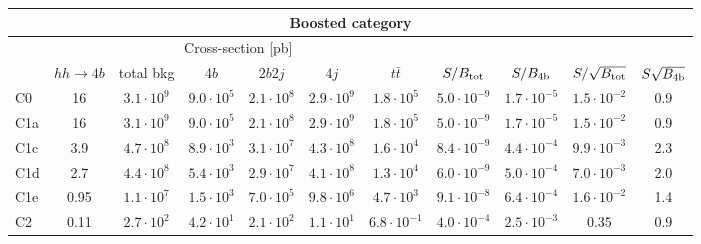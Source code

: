 \begin{tabular}{|l|cc|cccc|cccc|}
  \hline
\multicolumn{11}{|c|}{Boosted category}\\
\hline
&  \multicolumn{6}{c|}{Cross-section [pb]} &  &  & &  \\
   &  $hh\to 4b$ &  total bkg  &   $4b$    &  $2b2j$   &   $4j$    &
$t\bar{t}$ &
$S/B_{\rm tot}$ & $S/B_{\rm 4b}$ & $S/\sqrt{B_{\rm tot}}$ & $S\sqrt{B_{\rm 4b}}$ \\
  \hline
  \hline
 C0      & 16  &   $3.1\cdot 10^9$   & $9.0\cdot 10^5$ & $2.1\cdot 10^8$ & $2.9\cdot 10^9$ & $1.8\cdot 10^5$ &   $5.0\cdot 10^{-9}$   & $1.7\cdot 10^{-5}$  &   $1.5\cdot 10^{-2}$   & 0.9 \\
 C1a     & 16  &   $3.1\cdot 10^9 $  & $9.0\cdot 10^5$ & $2.1\cdot 10^8$ & $2.9\cdot 10^9$ & $1.8\cdot 10^5$ &   $5.0\cdot 10^{-9}$   & $1.7\cdot 10^{-5}$   &   $1.5\cdot 10^{-2}$   & 0.9 \\
 C1c     & 3.9  &   $4.7\cdot 10^8 $  & $8.9\cdot 10^3$ & $3.1\cdot 10^7$ & $4.3\cdot 10^8$ & $1.6\cdot 10^4$   &  $ 8.4\cdot 10^{-9}$   & $4.4\cdot 10^{-4}$  &  $ 9.9\cdot 10^{-3}$   & 2.3 \\
 C1d     & 2.7  &   $4.4\cdot 10^8 $  & $5.4\cdot 10^3$ & $2.9\cdot 10^7$ & $4.1\cdot 10^8$ & $1.3\cdot 10^4$ &   $6.0\cdot 10^{-9}$   & $5.0\cdot 10^{-4}$  &   $7.0\cdot 10^{-3}$   & 2.0 \\
 C1e     & 0.95  &   $1.1\cdot 10^7$   & $1.5\cdot 10^3$ & $7.0\cdot 10^5$ & $9.8\cdot 10^6$ & $4.7\cdot 10^3$  &  $ 9.1\cdot 10^{-8}$   & $6.4\cdot 10^{-4}$  &   $1.6\cdot 10^{-2}$   & 1.4 \\
 C2      & 0.11  &   $2.7\cdot 10^2$   & $4.2\cdot 10^1$ & $2.1\cdot 10^2$ & $1.1\cdot 10^1$ & $6.8\cdot 10^{-1}$  &  $ 4.0\cdot 10^{-4}$   & $2.5\cdot 10^{-3}$  &   $0.35$   & 0.9 \\
\hline
\end{tabular}
